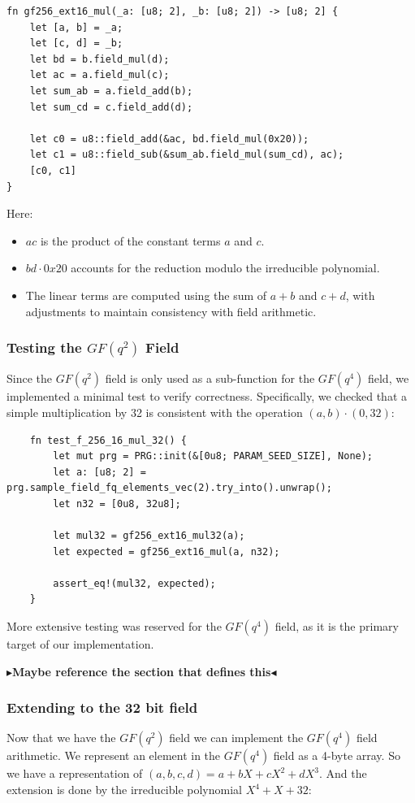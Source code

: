 \documentclass[11pt]{report}
\theoremstyle{definition}
\theoremstyle{plain}
\newcommand{\todo}[1]{{\color[rgb]{.5,0,0}\textbf{$\blacktriangleright$#1$\blacktriangleleft$}}}
\begin{document}
\begin{verbatim}
fn gf256_ext16_mul(_a: [u8; 2], _b: [u8; 2]) -> [u8; 2] {
    let [a, b] = _a;
    let [c, d] = _b;
    let bd = b.field_mul(d);
    let ac = a.field_mul(c);
    let sum_ab = a.field_add(b);
    let sum_cd = c.field_add(d);

    let c0 = u8::field_add(&ac, bd.field_mul(0x20));
    let c1 = u8::field_sub(&sum_ab.field_mul(sum_cd), ac);
    [c0, c1]
}
\end{verbatim}

Here:
\begin{itemize}
  \item $ac$ is the product of the constant terms $a$ and $c$.
  \item $bd \cdot 0x20$ accounts for the reduction modulo the irreducible polynomial.
  \item The linear terms are computed using the sum of $a+b$ and $c+d$, with adjustments to maintain consistency with field arithmetic.
\end{itemize}

\subsubsection{Testing the $GF(q^2)$ Field}

Since the $GF(q^2)$ field is only used as a sub-function for the $GF(q^4)$ field, we implemented a minimal test to verify correctness. Specifically, we checked that a simple multiplication by 32 is consistent with the operation $(a, b) \cdot (0, 32)$:

\begin{verbatim}
    fn test_f_256_16_mul_32() {
        let mut prg = PRG::init(&[0u8; PARAM_SEED_SIZE], None);
        let a: [u8; 2] = prg.sample_field_fq_elements_vec(2).try_into().unwrap();
        let n32 = [0u8, 32u8];

        let mul32 = gf256_ext16_mul32(a);
        let expected = gf256_ext16_mul(a, n32);

        assert_eq!(mul32, expected);
    }
\end{verbatim}

More extensive testing was reserved for the $GF(q^4)$ field, as it is the primary target of our implementation.

\todo{Maybe reference the section that defines this}

\subsubsection{Extending to the 32 bit field}\label{sec:gf_256_32_bit_field} %
Now that we have the $GF(q^2)$ field we can implement the $GF(q^4)$ field arithmetic. We represent an element in the $GF(q^4)$ field as a 4-byte array. So we have a representation of $(a,b,c,d) = a + bX + cX^2 + dX^3$. And the extension is done by the irreducible polynomial $X^4 + X + 32$:
\end{document}
